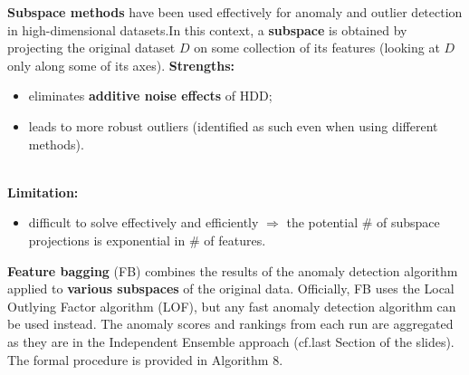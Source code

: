 \documentclass[20pt,landscape,footrule,headrule]{foils}
\newcommand{\newl}{\newline\newline}
\def\fh{\foilhead}
\begin{document}
{{\fh{5.4.3 -- Subspace  Methods} \label{5.4.3}
\noindent \textbf{Subspace methods} have been used effectively for anomaly and outlier detection in high-dimen\-sional datasets.\newl In this context, a \textbf{subspace} is obtained by projecting the original dataset $D$ on some collection of its features (looking at $D$ only along some of its axes). 
\newl \textbf{Strengths:} 
\begin{itemize}
\item eliminates \textbf{additive noise effects} of HDD;
\item leads to more robust outliers (identified as such even when using different methods).
\end{itemize}
\newpage\ \\ \noindent \textbf{Limitation:} \begin{itemize}
\item difficult to solve effectively and efficiently $\Longrightarrow$ the potential \# of subspace projections is exponential in  \# of features. \end{itemize} \textbf{Feature bagging} (FB) combines the results of the anomaly detection algorithm applied to \textbf{various subspaces} of the original data. \newl Officially, FB uses the Local Outlying Factor algorithm (LOF), but any fast anomaly detection algorithm can be used instead. \newl The anomaly scores and rankings from each run are aggregated as they are in the Independent Ensemble approach (cf.\@ last Section of the slides).\newl 
The formal procedure is provided in Algorithm 8.

}}
\end{document}
